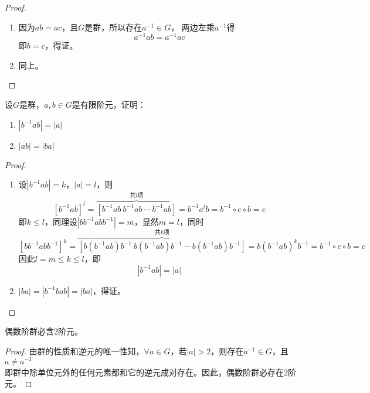 \begin{proof}

    \begin{enumerate}

        \item 
            因为$ab = ac$，且$G$是群，所以存在$a^{-1} \in G$， 两边左乘$a^{-1}$得
            $$a^{-1} ab = a^{-1}ac$$
            即$b = c$，得证。

        \item 同上。
        
    \end{enumerate}

\end{proof}

\begin{proposition}

    设$G$是群，$a,b\in G$是有限阶元，证明：

    \begin{enumerate}

        \item $|b^{-1}ab| = |a|$
        
        \item $|ab| = |ba|$
        
    \end{enumerate}

\end{proposition}

\begin{proof}

    \begin{enumerate}

        \item 
            设$|b^{-1}ab| = k$，$|a| = l$，则
            $$[b^{-1}ab]^l = \overbrace{[b^{-1}ab \  b^{-1}ab \ \cdots \  b^{-1}ab]}^{共l项} = b^{-1}a^{l}b = b^{-1}\circ e \circ b = e$$
            即$k \leq l$，同理设$|bb^{-1}abb^{-1}| = m$，显然$m = l$，同时
            $$[bb^{-1}abb^{-1}]^k = \overbrace{[b(b^{-1}ab)b^{-1} \  b(b^{-1}ab)b^{-1} \ \cdots \  b(b^{-1}ab)b^{-1}]}^{共k项} = b(b^{-1}ab)^kb^{-1} = b^{-1}\circ e \circ b = e$$
            因此$l = m \leq k \leq l$，即
            $$|b^{-1}ab| = |a|$$
            
        \item 
            $|ba| = |b^{-1}bab| = |ba|$，得证。
        
    \end{enumerate}

\end{proof}

\begin{proposition}

    偶数阶群必含$2$阶元。

\end{proposition}

\begin{proof}

    由群的性质和逆元的唯一性知，$\forall a \in G$，若$|a| > 2$，则存在$a^{-1} \in G$，且$a \neq a^{-1}$ \\
    即群中除单位元外的任何元素都和它的逆元成对存在。因此，偶数阶群必存在$2$阶元。

\end{proof}
